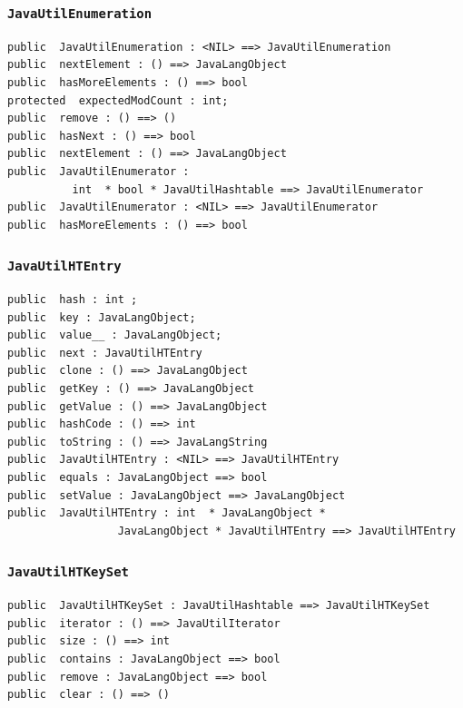 \documentclass[\pformat,12pt]{article}
\begin{document}
\subsubsection{\texttt{JavaUtilEnumeration}}
\begin{small}
\begin{verbatim}
public  JavaUtilEnumeration : <NIL> ==> JavaUtilEnumeration
public  nextElement : () ==> JavaLangObject
public  hasMoreElements : () ==> bool
protected  expectedModCount : int;
public  remove : () ==> ()
public  hasNext : () ==> bool
public  nextElement : () ==> JavaLangObject
public  JavaUtilEnumerator : 
          int  * bool * JavaUtilHashtable ==> JavaUtilEnumerator
public  JavaUtilEnumerator : <NIL> ==> JavaUtilEnumerator
public  hasMoreElements : () ==> bool
\end{verbatim}
\end{small}

\subsubsection{\texttt{JavaUtilHTEntry}}
\begin{small}
\begin{verbatim}
public  hash : int ;
public  key : JavaLangObject;
public  value__ : JavaLangObject;
public  next : JavaUtilHTEntry
public  clone : () ==> JavaLangObject
public  getKey : () ==> JavaLangObject
public  getValue : () ==> JavaLangObject
public  hashCode : () ==> int
public  toString : () ==> JavaLangString
public  JavaUtilHTEntry : <NIL> ==> JavaUtilHTEntry
public  equals : JavaLangObject ==> bool
public  setValue : JavaLangObject ==> JavaLangObject
public  JavaUtilHTEntry : int  * JavaLangObject * 
                 JavaLangObject * JavaUtilHTEntry ==> JavaUtilHTEntry
\end{verbatim}
\end{small}

\subsubsection{\texttt{JavaUtilHTKeySet}}
\begin{small}
\begin{verbatim}
public  JavaUtilHTKeySet : JavaUtilHashtable ==> JavaUtilHTKeySet
public  iterator : () ==> JavaUtilIterator
public  size : () ==> int
public  contains : JavaLangObject ==> bool
public  remove : JavaLangObject ==> bool
public  clear : () ==> ()
\end{verbatim}
\end{small}
\end{document}
